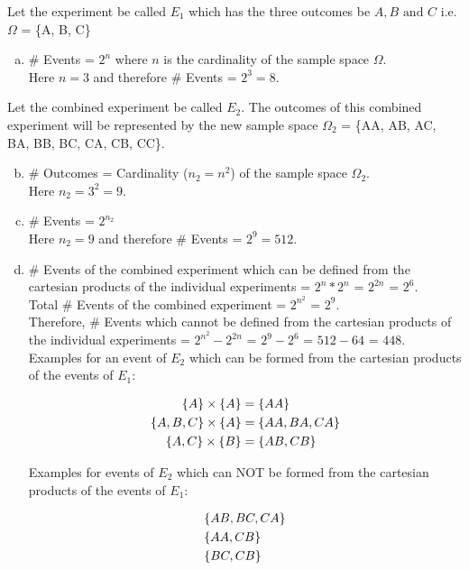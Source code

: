 Let the experiment be called $E_1$ which has the three outcomes be $A, B \text{ and } C$ i.e. $\Omega$ = \{A, B, C\}\\
\begin{enumerate}[a.]
	\item \# Events = $2^n$ where $n$ is the cardinality of the sample space $\Omega$. \\
	Here $n = 3$ and therefore \# Events = $2^3 = 8$.
\end{enumerate}	
	Let the combined experiment be called $E_2$.
	The outcomes of this combined experiment will be represented by the new sample space $\Omega_2$ = \{AA, AB, AC, BA, BB, BC, CA, CB, CC\}.
\begin{enumerate}[a.]\setcounter{enumi}{1}
	\item \# Outcomes = Cardinality ($n_2 = n^2$) of the sample space $\Omega_2$. \\
	Here $n_2 = 3^2 = 9$.
	\item \# Events = $2^{n_2}$ \\
	Here $n_2 = 9$ and therefore \# Events = $2^9 = 512$.
	\item \# Events of the combined experiment which can be defined from the cartesian products of the individual experiments = $2^n * 2^n$ = $2^{2n}$ = $2^6$. \\
	Total \# Events of the combined experiment = $2^{n^2}$ = $2^9$.\\
	Therefore, \# Events which cannot be defined from the cartesian products of the individual experiments = $2^{n^2} - 2^{2n}$ = $2^9 - 2^6$ = $512 - 64$ = $448$.\\[10pt]
	Examples for an event of $E_2$ which can be formed from the cartesian products of the events of $E_1$:
	
	\begin{align*}
		\{A\} \times \{A\} &= \{AA\} \nonumber\\
		\{A, B, C\} \times \{A\} &= \{AA, BA, CA\} \nonumber\\
		\{A, C\} \times \{B\} &= \{AB, CB\} \nonumber
	\end{align*} 

	Examples for events of $E_2$ which can NOT be formed from the cartesian products of the events of $E_1$:

	\begin{align*}
		& \{AB, BC, CA\} \nonumber\\
		& \{AA, CB\} \nonumber\\
		& \{BC, CB\} \nonumber
	\end{align*} 
	\end{enumerate}	
